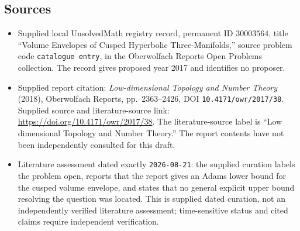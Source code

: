 \documentclass[11pt]{article}
\begin{document}
\subsection{Sources}
\begin{itemize}
\item Supplied local UnsolvedMath registry record, permanent ID \(30003564\), title ``Volume Envelopes of Cusped Hyperbolic Three-Manifolds,'' source problem code \texttt{catalogue entry}, in the Oberwolfach Reports Open Problems collection. The record gives proposed year 2017 and identifies no proposer.
\item Supplied report citation: \emph{Low-dimensional Topology and Number Theory} (2018), Oberwolfach Reports, pp.\ 2363--2426, DOI \texttt{10.4171/owr/2017/38}. Supplied source and literature-source link: \url{https://doi.org/10.4171/owr/2017/38}. The literature-source label is ``Low dimensional Topology and Number Theory.'' The report contents have not been independently consulted for this draft.
\item Literature assessment dated exactly \texttt{2026-08-21}: the supplied curation labels the problem open, reports that the report gives an Adams lower bound for the cusped volume envelope, and states that no general explicit upper bound resolving the question was located. This is supplied dated curation, not an independently verified literature assessment; time-sensitive status and cited claims require independent verification.
\end{itemize}
\end{document}
